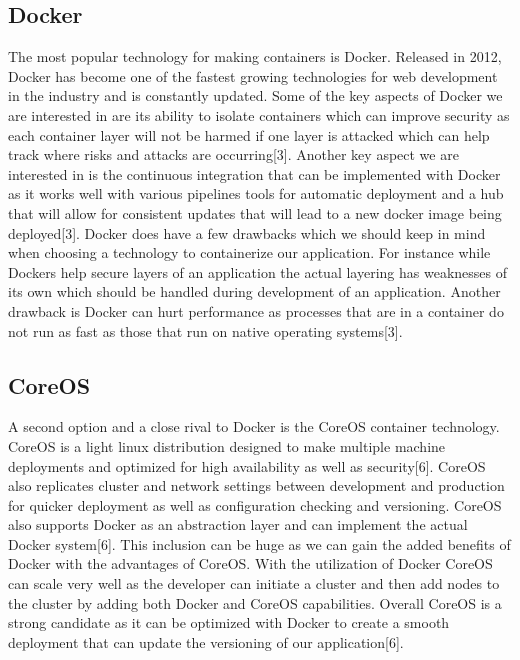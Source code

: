 \documentclass[onecolumn, draftclsnofoot,10pt, compsoc]{IEEEtran}
\begin{document}
\subsection{Docker}
The most popular technology for making containers is Docker. Released in 2012, Docker has become one of the fastest growing technologies for web development in the industry and is constantly updated. Some of the key aspects of Docker we are interested in are its ability to isolate containers which can improve security as each container layer will not be harmed if one layer is attacked which can help track where risks and attacks are occurring[3]. Another key aspect we are interested in is the continuous integration that can be implemented with Docker as it works well with various pipelines tools for automatic deployment and a hub that will allow for consistent updates that will lead to a new docker image being deployed[3]. Docker does have a few drawbacks which we should keep in mind when choosing a technology to containerize our application. For instance while Dockers help secure layers of an application the actual layering has weaknesses of its own which should be handled during development of an application. Another drawback is Docker can hurt performance as processes that are in a container do not run as fast as those that run on native operating systems[3].

\subsection{CoreOS}
A second option and a close rival to Docker is the CoreOS container technology. CoreOS is a light linux distribution designed to make multiple machine deployments and optimized for high availability as well as security[6]. CoreOS also replicates cluster and network settings between development and production for quicker deployment as well as conﬁguration checking and versioning. CoreOS also supports Docker as an abstraction layer and can implement the actual Docker system[6]. This inclusion can be huge as we can gain the added beneﬁts of Docker with the advantages of CoreOS. With the utilization of Docker CoreOS can scale very well as the developer can initiate a cluster and then add nodes to the cluster by adding both Docker and CoreOS capabilities. Overall CoreOS is a strong candidate as it can be optimized with Docker to create a smooth deployment that can update the versioning of our application[6]. 
\end{document}
